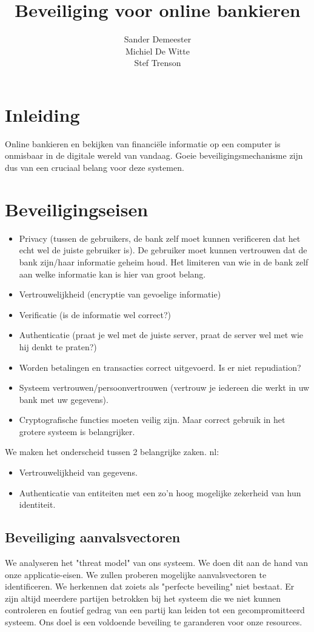 \documentclass[11pt]{article}
\title{\textbf{Beveiliging voor online bankieren}}
\author{Sander Demeester\\
		Michiel De Witte\\
		Stef Trenson}
\date{}
\begin{document}
\maketitle

\section{Inleiding}
Online bankieren en bekijken van financi\"ele informatie op een computer is onmisbaar in de digitale wereld van vandaag. Goeie beveiligingsmechanisme zijn dus van een cruciaal belang voor deze systemen. 

\section{Beveiligingseisen}
\label{sec:bev_eis}
\begin{itemize}
\item Privacy (tussen de gebruikers, de bank zelf moet kunnen verificeren dat het echt wel de juiste gebruiker is). De gebruiker moet kunnen vertrouwen dat de bank zijn/haar informatie geheim houd. Het limiteren van wie in de bank zelf aan welke informatie kan is hier van groot belang.
\item Vertrouwelijkheid (encryptie van gevoelige informatie)
\item Verificatie (is de informatie wel correct?)
\item Authenticatie (praat je wel met de juiste server, praat de server wel met wie hij denkt te praten?)
\item Worden betalingen en transacties correct uitgevoerd. Is er niet repudiation?
\item Systeem vertrouwen/persoonvertrouwen (vertrouw je iedereen die werkt in uw bank met uw gegevens). 
\item Cryptografische functies moeten veilig zijn. Maar correct gebruik in het grotere systeem is belangrijker.
\end{itemize}
We maken het onderscheid tussen 2 belangrijke zaken. nl: 
\begin{itemize}
\item Vertrouwelijkheid van gegevens.
\item Authenticatie van entiteiten met een zo'n hoog mogelijke zekerheid van hun identiteit. 
\end{itemize}
\subsection{Beveiliging aanvalsvectoren}
We analyseren het "threat model" van ons systeem. We doen dit aan de hand van onze applicatie-eisen. We zullen proberen mogelijke aanvalsvectoren te identificeren. We herkennen dat zoiets als "perfecte beveiling" niet bestaat. Er zijn altijd meerdere partijen betrokken bij het systeem die we niet kunnen controleren en foutief gedrag van een partij kan leiden tot een gecompromitteerd systeem. Ons doel is een voldoende beveiling te garanderen voor onze resources.
\end{document}
